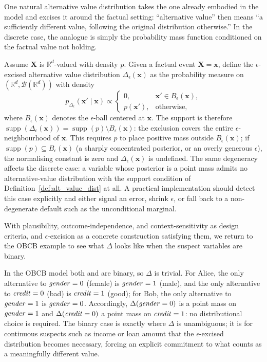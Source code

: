 \noindent One natural alternative value distribution takes the one already embodied in the model and excises it around the factual setting: ``alternative value'' then means ``a sufficiently different value, following the original distribution otherwise.'' In the discrete case, the analogue is simply the probability mass function conditioned on the factual value not holding.



\begin{example}\label{ex:eps_excised}
Assume $\mathbf{X}$ is $\mathbb{R}^d$-valued with density $p$.
Given a factual event $\mathbf{X}=\mathbf{x}$, define the
$\epsilon$-excised alternative value distribution $\Delta_\epsilon(\mathbf{x})$
as the probability measure on $(\mathbb{R}^d,\mathcal{B}(\mathbb{R}^d))$ with density
\[
p_{\Delta_\epsilon}(\mathbf{x}'\mid \mathbf{x})\propto
\begin{cases}
0, & \mathbf{x}'\in B_\epsilon(\mathbf{x}),\\[4pt]
p(\mathbf{x}'), & \text{otherwise},
\end{cases}
\]
where $B_\epsilon(\mathbf{x})$ denotes the $\epsilon$-ball centered at $\mathbf{x}$.
The support is therefore
$\operatorname{supp}(\Delta_\epsilon(\mathbf{x})) = \operatorname{supp}(p) \setminus B_\epsilon(\mathbf{x})$:
the exclusion covers the entire $\epsilon$-neighbourhood of $\mathbf{x}$. This requires $p$ to place positive mass
outside $B_\epsilon(\mathbf{x})$; if $\operatorname{supp}(p)\subseteq B_\epsilon(\mathbf{x})$
(a sharply concentrated posterior, or an overly generous $\epsilon$), the
normalising constant is zero and $\Delta_\epsilon(\mathbf{x})$ is undefined. The
same degeneracy affects the discrete case: a variable whose posterior is a point
mass admits no alternative-value distribution with the support condition of
Definition~\ref{def:alt_value_dist} at all. A practical implementation should
detect this case explicitly and either signal an error, shrink $\epsilon$, or fall
back to a non-degenerate default such as the unconditional marginal.
\end{example}

\medskip\noindent With plausibility, outcome-independence, and context-sensitivity as
design criteria, and $\epsilon$-excision as a concrete construction satisfying them, we
return to the OBCB example to see what $\Delta$ looks like when the suspect variables are
binary.

In the OBCB model both  and  are binary, so $\Delta$ is
trivial. For Alice, the only alternative to $\varname{gender}=0$ (female) is
$\varname{gender}=1$ (male), and the only alternative to $\varname{credit}=0$ (bad) is
$\varname{credit}=1$ (good); for Bob, the only alternative to $\varname{gender}=1$ is
$\varname{gender}=0$. Accordingly, $\Delta(\varname{gender}=0)$ is a point mass on
$\varname{gender}=1$ and $\Delta(\varname{credit}=0)$ a point mass on
$\varname{credit}=1$: no distributional choice is required. The binary case is exactly
where $\Delta$ is unambiguous; it is for continuous suspects such as income or loan amount
that the $\epsilon$-excised distribution becomes necessary, forcing an explicit commitment
to what counts as a meaningfully different value.

